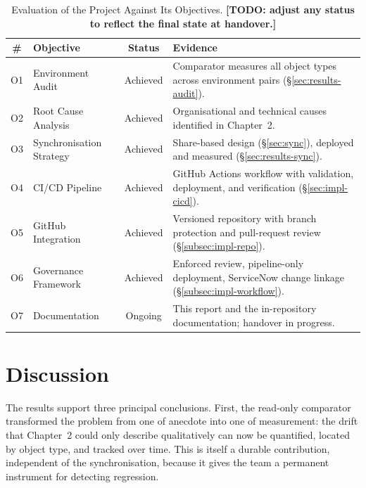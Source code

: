 \begin{table}[H]
  \centering
  \begin{tabularx}{\textwidth}{c l c X}
    \toprule
    \rowcolor{ibmblue!15}
    \textbf{\#} & \textbf{Objective} & \textbf{Status} & \textbf{Evidence} \\
    \midrule
    O1 & Environment Audit       & Achieved & Comparator measures all object types across environment pairs (\S\ref{sec:results-audit}). \\
    O2 & Root Cause Analysis     & Achieved & Organisational and technical causes identified in Chapter~2. \\
    O3 & Synchronisation Strategy& Achieved & Share-based design (\S\ref{sec:sync}), deployed and measured (\S\ref{sec:results-sync}). \\
    O4 & CI/CD Pipeline          & Achieved & GitHub Actions workflow with validation, deployment, and verification (\S\ref{sec:impl-cicd}). \\
    O5 & GitHub Integration      & Achieved & Versioned repository with branch protection and pull-request review (\S\ref{subsec:impl-repo}). \\
    O6 & Governance Framework    & Achieved & Enforced review, pipeline-only deployment, ServiceNow change linkage (\S\ref{subsec:impl-workflow}). \\
    O7 & Documentation           & Ongoing  & This report and the in-repository documentation; handover in progress. \\
    \bottomrule
  \end{tabularx}
  \caption{Evaluation of the Project Against Its Objectives. \textbf{[TODO: adjust any status to reflect the final state at handover.]}}
  \label{tab:objective-eval}
\end{table}

\section{Discussion}
\label{sec:results-discussion}

The results support three principal conclusions. First, the read-only comparator transformed the problem from one of anecdote into one of measurement: the drift that Chapter~2 could only describe qualitatively can now be quantified, located by object type, and tracked over time. This is itself a durable contribution, independent of the synchronisation, because it gives the team a permanent instrument for detecting regression.

